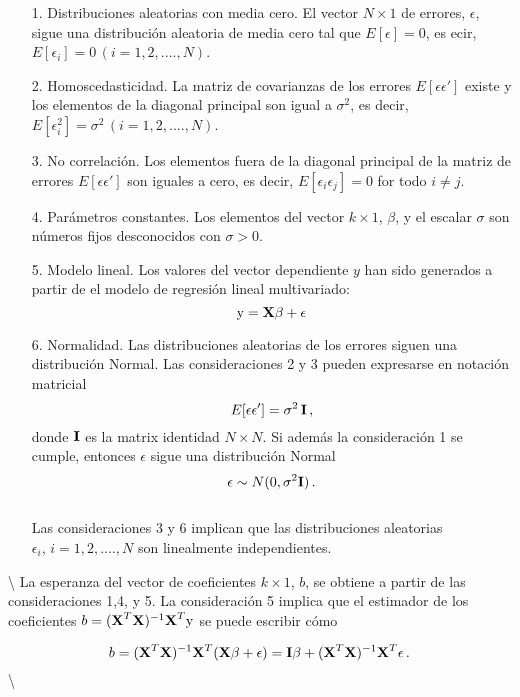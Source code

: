 \documentclass[
]{agujournal2019}
\begin{document}
\begin{itemize}
\item[1.]Distribuciones aleatorias con media cero. El vector
$N\times1$ de errores, $\epsilon$, sigue una distribución aleatoria de
media cero tal que $E[\epsilon]=0$, es ecir, $E[\epsilon_i]=
0\,(i=1,2,....,N)$.
\item[2.]Homoscedasticidad. La matriz de covarianzas de los errores
$E[\epsilon \epsilon']$ existe y los elementos de la diagonal
principal son igual a $\sigma^2$, es decir,
$E[\epsilon^2_i]=\sigma^2\,(i=1,2,....,N)$.
\item[3.]No correlación. Los elementos fuera de la diagonal principal
de la matriz de errores $E[\epsilon \epsilon']$ son iguales a cero,
es decir, $E[\epsilon_i\epsilon_j]=0$ for todo $i\neq j$.
\item[4.]Parámetros constantes. Los elementos del vector $k\times1$,
$\beta$, y el escalar $\sigma$ son números fijos desconocidos con
$\sigma>0$.
\item[5.]Modelo lineal. Los valores del vector dependiente $y$ han sido
generados a partir de el modelo de regresión lineal multivariado:
$${\rm y}={\textbf X}\beta + \epsilon$$
\item[6.]Normalidad. Las distribuciones aleatorias de los errores siguen
una distribución Normal. Las consideraciones 2 y 3 pueden expresarse en
notación matricial
$$E[\epsilon \epsilon']=\sigma^2\,{\textbf I}\,,$$
donde ${\textbf I}$ es la matrix identidad $N\times N$. Si además la
consideración 1 se cumple, entonces $\epsilon$ sigue una distribución Normal
$$\epsilon\sim N(0,\sigma^2{\textbf I})\,.$$
\\
\noindent Las consideraciones 3 y 6 implican que las distribuciones aleatorias $\epsilon_i,\,
i=1,2,....,N$ son linealmente independientes.
\end{itemize}

\vspace{0.5cm}

 \textbackslash{}
\noindent La esperanza del vector de coeficientes \(k\times 1\), \(b\),
se obtiene a partir de las consideraciones 1,4, y 5. La consideración 5
implica que el estimador de los coeficientes
\(b=({\textbf X}^T{\textbf X})^{-1}{\textbf X}^T {\rm y}\) se puede
escribir cómo

\[b=({\textbf X}^T{\textbf X})^{-1}{\textbf X}^T({\textbf X} \beta + \epsilon)={\textbf I}\beta +
    ({\textbf X}^T{\textbf X})^{-1}{\textbf X}^T \epsilon\,.\]
\textbackslash{}
\end{document}
